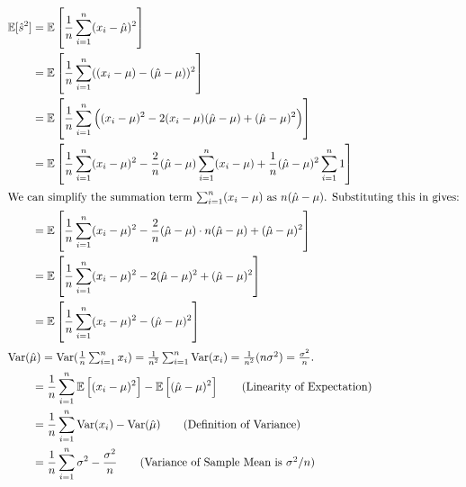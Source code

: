 \documentclass[10pt]{article}
\begin{document}
\begin{enumerate}[label=(\alph*)]
	      \begin{align*}
		      \mathbb{E}[\hat{s}^2] & = \mathbb{E}\left[\frac{1}{n}\sum_{i=1}^{n}(x_i - \hat{\mu})^2\right]                                                                                                    \\
		                            & = \mathbb{E}\left[\frac{1}{n}\sum_{i=1}^{n}((x_i - \mu) - (\hat{\mu} - \mu))^2\right]                                                                                    \\
		                            & = \mathbb{E}\left[\frac{1}{n}\sum_{i=1}^{n}\left((x_i - \mu)^2 - 2(x_i - \mu)(\hat{\mu} - \mu) + (\hat{\mu} - \mu)^2\right)\right]                                       \\
		                            & = \mathbb{E}\left[\frac{1}{n}\sum_{i=1}^{n}(x_i - \mu)^2 - \frac{2}{n}(\hat{\mu} - \mu)\sum_{i=1}^{n}(x_i - \mu) + \frac{1}{n}(\hat{\mu} - \mu)^2 \sum_{i=1}^{n}1\right] \\
		      \intertext{We can simplify the summation term $\sum_{i=1}^{n}(x_i - \mu)$ as $n(\hat{\mu} - \mu)$. Substituting this in gives:}
		                            & = \mathbb{E}\left[\frac{1}{n}\sum_{i=1}^{n}(x_i - \mu)^2 - \frac{2}{n}(\hat{\mu} - \mu) \cdot n(\hat{\mu} - \mu) + (\hat{\mu} - \mu)^2\right]                            \\
		                            & = \mathbb{E}\left[\frac{1}{n}\sum_{i=1}^{n}(x_i - \mu)^2 - 2(\hat{\mu} - \mu)^2 + (\hat{\mu} - \mu)^2\right]                                                             \\
		                            & = \mathbb{E}\left[\frac{1}{n}\sum_{i=1}^{n}(x_i - \mu)^2 - (\hat{\mu} - \mu)^2\right]                                                                                    \\
		      \intertext{$\text{Var}(\hat{\mu}) = \text{Var}(\frac{1}{n}\sum_{i=1}^{n} x_i) = \frac{1}{n^2} \sum_{i=1}^{n} \text{Var}(x_i) = \frac{1}{n^2} (n\sigma^2) = \frac{\sigma^2}{n}$.}
		                            & = \frac{1}{n}\sum_{i=1}^{n}\mathbb{E}\left[(x_i - \mu)^2\right] - \mathbb{E}\left[(\hat{\mu} - \mu)^2\right] \tag{Linearity of Expectation}                              \\
		                            & = \frac{1}{n}\sum_{i=1}^{n}\text{Var}(x_i) - \text{Var}(\hat{\mu}) \tag{Definition of Variance}                                                                          \\
		                            & = \frac{1}{n}\sum_{i=1}^{n}\sigma^2 - \frac{\sigma^2}{n} \tag{Variance of Sample Mean is $\sigma^2/n$}                                                                   \\

\end{align*}
\end{enumerate}
\end{document}
